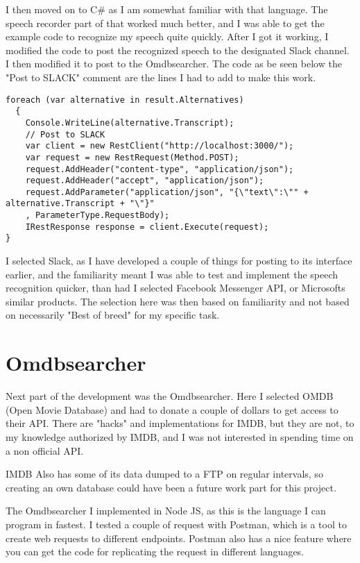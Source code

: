 \documentclass[11pt,fleqn]{book} %
\begin{document}
I then moved on to C\# as I am somewhat familiar with that language. The speech recorder part of that worked much better, and I was able to get the example code to recognize my speech quite quickly.
After I got it working, I modified the code to post the recognized speech to the designated Slack channel. I then modified it to post to the Omdbsearcher. 
\newpage
The code as be seen below the "Post to SLACK" comment are the lines I had to add to make this work.
\begin{verbatim}
foreach (var alternative in result.Alternatives)
  {
    Console.WriteLine(alternative.Transcript);
    // Post to SLACK
    var client = new RestClient("http://localhost:3000/");
    var request = new RestRequest(Method.POST);
    request.AddHeader("content-type", "application/json");
    request.AddHeader("accept", "application/json");
    request.AddParameter("application/json", "{\"text\":\"" + alternative.Transcript + "\"}"
    , ParameterType.RequestBody);
    IRestResponse response = client.Execute(request);
}
\end{verbatim}

I selected Slack, as I have developed a couple of things for posting to its interface earlier, and the familiarity meant I was able to test and implement the speech recognition quicker, than had I selected Facebook Messenger API, or Microsofts similar products.
The selection here was then based on familiarity and not based on necessarily "Best of breed" for my specific task.

\section{Omdbsearcher}
Next part of the development was the Omdbsearcher. Here I selected OMDB (Open Movie Database)\cite{OMDbDatabase} and had to donate a couple of dollars to get access to their API. There are "hacks" and implementations for IMDB, but they are not, to my knowledge authorized by IMDB, and I was not interested in spending time on a non official API.

IMDB Also has some of its data dumped to a FTP on regular intervals, so creating an own database could have been a future work part for this project. \cite{IMDbAlternativeInterfaces}

The Omdbsearcher I implemented in Node JS, as this is the language I can program in fastest. I tested a couple of request with Postman, which is a tool to create web requests to different endpoints. Postman also has a nice feature where you can get the code for replicating the request in different languages.
\end{document}
